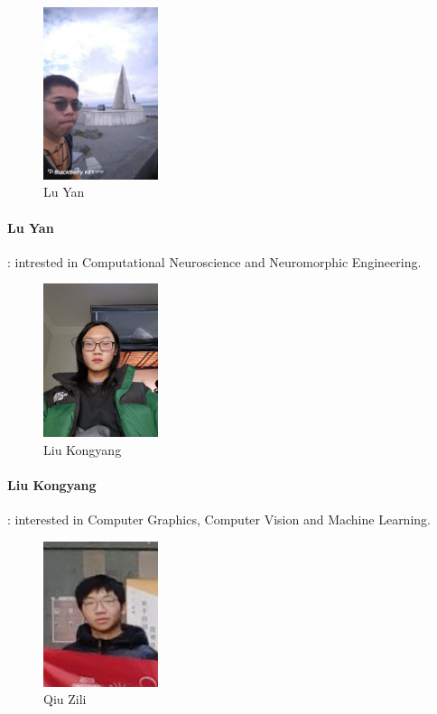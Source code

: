 \documentclass[a4paper, 11pt]{article}
\begin{document}
			\begin{figure}[H]
				\centering
				\includegraphics[width=0.3\textwidth]{Lu.jpg}
				\caption{Lu Yan} 
				\label{photo:1}  
			\end{figure} 
			\paragraph{Lu Yan}: intrested in Computational Neuroscience and Neuromorphic Engineering.
			
			
			\begin{figure}[H]
				\centering
				\includegraphics[width=0.3\textwidth]{Liu.jpg}
				\caption{Liu Kongyang} 
				\label{photo:2}  
			\end{figure} 
			\paragraph{Liu Kongyang}: interested in Computer Graphics, Computer Vision and Machine Learning.
			
			
			\begin{figure}[H]
				\centering
				\includegraphics[width=0.3\textwidth]{Qiu.jpg}
				\caption{Qiu Zili} 
				\label{photo:3}  
			\end{figure} 
\end{document}
